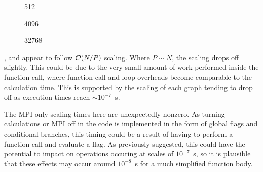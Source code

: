 %
%
\begin{figure}[!h]
    
    \caption{
        \vZeroTimeCaption
            {\systolicloop{}}
            {\individualoperation{}}
            {512}
    }
    \label{fig:v0_systolic_individual_operation_512_logtime}
\end  {figure}

\begin{figure}[!h]
    
    \caption{
        \vZeroTimeCaption
            {\systolicloop{}}
            {\individualoperation{}}
            {4096}
    }
    \label{fig:v0_systolic_individual_operation_4096_logtime}
\end  {figure}

\begin{figure}[!h]
    
    \caption{
        \vZeroTimeCaption
            {\systolicloop{}}
            {\individualoperation{}}
            {32768}
    }
    \label{fig:v0_systolic_individual_operation_32768_logtime}
\end  {figure}

\vZeroTimeExplanation
    {}
    {}
    {}
    {\individualoperation{}}
    {\systolicloop{}}


%
,
 and
appear to follow $\mathcal{O}{\left({ N/P }\right)}$ scaling.
%
Where $P \sim{} N$, the scaling drops off slightly.
%
This could be due to the very small amount of work performed
inside the function call, where function call and loop overheads
become comparable to the calculation time.
%
This is supported by the scaling of each graph tending to drop off
as execution times reach $\sim{} 10^{-7}$~s.

The MPI only scaling times here are unexpectedly nonzero.
%
As turning calculations or MPI off in the code is implemented in
the form of global flags and conditional branches, this timing
could be a result of having to perform a function call and
evaluate a flag.
%
As previously suggested, this could have the potential to impact on
operations occuring at scales of $10^{-7}$~s, so it is plausible
that these effects may occur around $10^{-8}$~s for a much simplified
function body.


